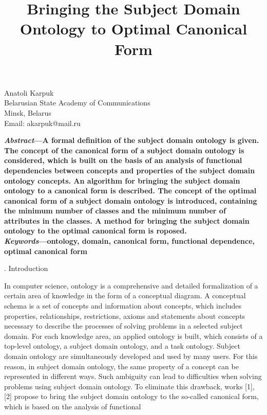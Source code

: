 \documentclass[10pt]{article}
\title{\textbf{Bringing the Subject Domain Ontology to
Optimal Canonical Form}}
\date{}
\newcommand{\RomanNumeralCaps}[1]
    {\MakeUppercase{\romannumeral 1}}
\begin{document}
 
\setcounter{page}{237}
\maketitle

\begin{center}
\vspace{-75pt}
    Anatoli Karpuk\\
Belarusian State Academy of Communications \\
Minsk, Belarus\\
Email: a\textunderscore karpuk@mail.ru\\
\end{center}
\begin{multicols}{2}
\textit{}
\textbf{\textit{Abstract}—A formal definition of the subject domain
ontology is given. The concept of the canonical form of
a subject domain ontology is considered, which is built on
the basis of an analysis of functional dependencies between
concepts and properties of the subject domain ontology
concepts. An algorithm for bringing the subject domain
ontology to a canonical form is described. The concept of
the optimal canonical form of a subject domain ontology
is introduced, containing the minimum number of classes
and the minimum number of attributes in the classes. A
method for bringing the subject domain ontology to the
optimal canonical form is roposed.\\
\textit{Keywords}—ontology, domain, canonical form, functional
dependence, optimal canonical form}
\begin{center}  
\RomanNumeralCaps{1}. Introduction
\end{center}
In computer science, ontology is a comprehensive and
detailed formalization of a certain area of knowledge in
the form of a conceptual diagram. A conceptual schema
is a set of concepts and information about concepts,
which includes properties, relationships, restrictions, axioms and statements about concepts necessary to describe
the processes of solving problems in a selected subject
domain. For each knowledge area, an applied ontology
is built, which consists of a top-level ontology, a subject
domain ontology, and a task ontology. Subject domain
ontology are simultaneously developed and used by
many users. For this reason, in subject domain ontology,
the same property of a concept can be represented in
different ways. Such ambiguity can lead to difficulties
when solving problems using subject domain ontology.
To eliminate this drawback, works [1], [2] propose to
bring the subject domain ontology to the so-called canonical form, which is based on the analysis of functional

\end{multicols}
\end{document}

